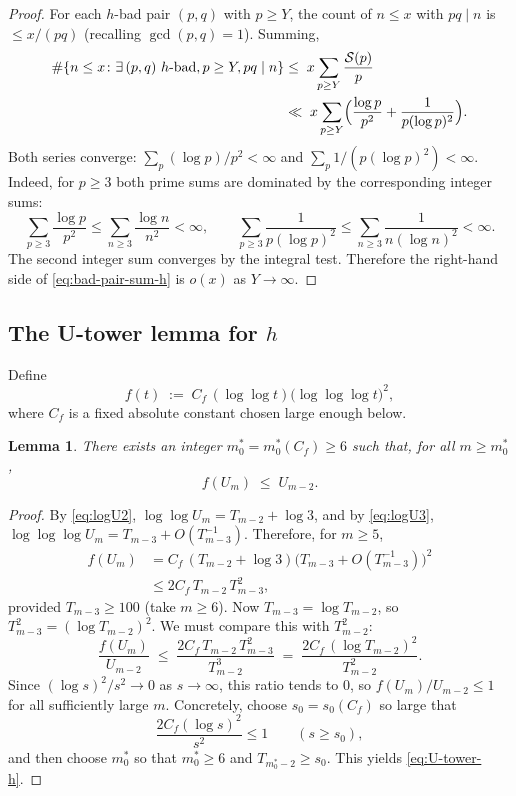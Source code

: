 \documentclass[11pt,reqno]{amsart}
\theoremstyle{plain}
\newtheorem{lemma}[theorem]{Lemma}
\theoremstyle{definition}
\begin{document}
\begin{proof}
For each $h$-bad pair $(p,q)$ with $p\ge Y$, the count of $n\le x$ with
$pq\mid n$ is $\le x/(pq)$ (recalling $\gcd(p,q)=1$). Summing,
\begin{align}
\#\{n\le x\colon\exists\,(p,q)\text{ $h$-bad}, p\ge Y, pq\mid n\}
&\le\; x\sum_{p\ge Y}\frac{\mathcal{S}(p)}{p}\nonumber\\
&\ll\; x\sum_{p\ge Y}\Bigl(\frac{\log p}{p^2}+\frac{1}{p(\log p)^2}\Bigr).\label{eq:bad-pair-sum-h}
\end{align}
Both series converge: $\sum_p (\log p)/p^2<\infty$ and $\sum_p 1/(p(\log p)^2)<\infty$.
Indeed, for $p\ge 3$ both prime sums are dominated by the corresponding
integer sums:
\[
\sum_{p\ge 3}\frac{\log p}{p^2}
\le
\sum_{n\ge 3}\frac{\log n}{n^2}
<\infty,
\qquad
\sum_{p\ge 3}\frac{1}{p(\log p)^2}
\le
\sum_{n\ge 3}\frac{1}{n(\log n)^2}
<\infty.
\]
The second integer sum converges by the integral test.
Therefore the right-hand side of \eqref{eq:bad-pair-sum-h} is $o(x)$
as $Y\to\infty$.
\end{proof}

\subsection{The U-tower lemma for $h$}

Define
\begin{equation}\label{eq:f-def}
f(t) \;:=\; C_f\,(\log\log t)\bigl(\log\log\log t\bigr)^2,
\end{equation}
where $C_f$ is a fixed absolute constant chosen large enough below.

\begin{lemma}\label{lem:U-tower-h}
There exists an integer $m_0^*=m_0^*(C_f)\ge 6$ such that, for all $m\ge m_0^*$,
\begin{equation}\label{eq:U-tower-h}
f(U_m) \;\le\; U_{m-2}.
\end{equation}
\end{lemma}

\begin{proof}
By \eqref{eq:logU2}, $\log\log U_m = T_{m-2}+\log 3$, and by \eqref{eq:logU3},
$\log\log\log U_m = T_{m-3}+O(T_{m-3}^{-1})$. Therefore, for $m\ge 5$,
\begin{align}
f(U_m) &= C_f\,(T_{m-2}+\log 3)\bigl(T_{m-3}+O(T_{m-3}^{-1})\bigr)^2\nonumber\\
&\le 2C_f\, T_{m-2}\,T_{m-3}^2,\label{eq:fUm}
\end{align}
provided $T_{m-3}\ge 100$ (take $m\ge 6$). Now $T_{m-3}=\log T_{m-2}$, so
$T_{m-3}^2=(\log T_{m-2})^2$. We must compare this with $T_{m-2}^2$:
\[
\frac{f(U_m)}{U_{m-2}}\;\le\;\frac{2C_f\,T_{m-2}\,T_{m-3}^2}{T_{m-2}^3}\;=\;\frac{2C_f\,(\log T_{m-2})^2}{T_{m-2}^2}.
\]
Since $(\log s)^2/s^2\to 0$ as $s\to\infty$, this ratio tends to $0$, so
$f(U_m)/U_{m-2}\le 1$ for all sufficiently large $m$. Concretely, choose
$s_0=s_0(C_f)$ so large that
\[
   \frac{2C_f(\log s)^2}{s^2}\le 1 \qquad (s\ge s_0),
\]
and then choose $m_0^*$ so that $m_0^*\ge 6$ and
$T_{m_0^*-2}\ge s_0$. This yields \eqref{eq:U-tower-h}.
\end{proof}
\end{document}
